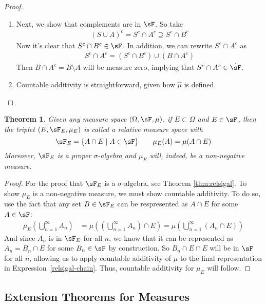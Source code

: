 \documentclass[12pt]{article}
\theoremstyle{plain}
\newtheorem{thm}{Theorem}[section]
\theoremstyle{definition}
\theoremstyle{remark}
\begin{document}
\begin{proof}
\begin{enumerate}
  \item
    Next, we show that complements are in $\sF$. So take
    \begin{align*}
      (S\cup A)^c = S^c \cap A^c \supseteq S^c \cap B^c
    \end{align*}
    Now it's clear that $S^c \cap B^c\in \sF$. In addition, we can
    rewrite $S^c\cap A^c$ as
    \begin{align*}
      S^c\cap A^c = (S^c \cap B^c) \cup (B\cap A^c)
    \end{align*}
    Then $B \cap A^c = B\setminus A$ will be measure zero, implying that
    $S^c \cap A^c\in \hat{\sF}$.

  \item Countable additivity is straightforward, given how $\hat{\mu}$
    is defined.
\end{enumerate}
\end{proof}

\begin{thm}
Given any measure space $(\Omega,\sF,\mu)$, if $E\subset \Omega$ and
$E\in\sF$, then the triplet $(E,\sF_E,\mu_E)$ is called
a \emph{relative measure space} with
\[
    \sF_E = \{ A \cap E \; | \; A \in \sF\}
    \qquad
    \mu_E(A) = \mu(A\cap E)
\]
Moreover, $\sF_E$ is a proper $\sigma$-algebra and $\mu_E$ will,
indeed, be a non-negative measure.
\end{thm}
\begin{proof}
For the proof that $\sF_E$ is a $\sigma$-algebra, see Theorem
\ref{thm:relsigal}. To show $\mu_E$ is a non-negative measure, we must
show countable additivity. To do so, use the fact that any set
$B\in\sF_E$ can be respresented as $A\cap E$ for some $A\in\sF$:
\begin{align}
    \label{relsigal-chain}
    \mu_E\left(\bigcup^\infty_{n=1} A_n \right)
    &= \mu\left(\left(\bigcup^\infty_{n=1} A_n
    \right) \cap E \right)
    = \mu\left(\bigcup^\infty_{n=1} (A_n
    \cap E)\right)
\end{align}
And since $A_n$ is in $\sF_E$ for all $n$, we know that it can be
represented as $A_n=B_n\cap E$ for some $B_n\in \sF$ by construction. So
$B_n \cap E \cap E$ will be in $\sF$ for all $n$, allowing us to apply
countable additivity of $\mu$ to the final representation in
Expression~\ref{relsigal-chain}. Thus, countable additivity for $\mu_E$
will follow.
\end{proof}



\clearpage
\subsection{Extension Theorems for Measures}
\label{sec:extension}
\end{document}
